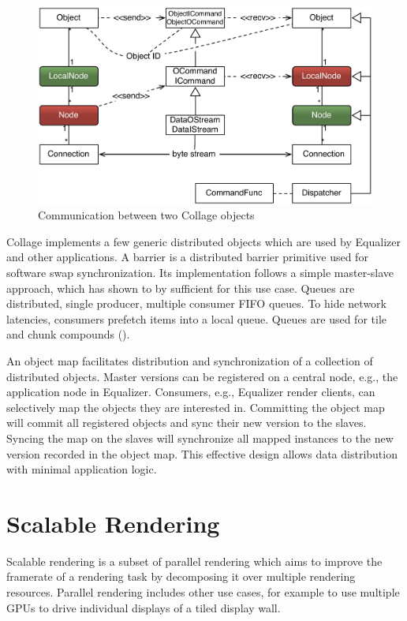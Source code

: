 \begin{figure}[ht]\center
  \includegraphics[width=\columnwidth]{images/netObject}
  \caption{\label{fNetObject}Communication between two \textsf{Collage} objects}
\end{figure}

\textsf{Collage} implements a few generic distributed objects which are used by
\textsf{Equalizer} and other applications. A barrier is a distributed barrier
primitive used for software swap synchronization. Its implementation follows a
simple master-slave approach, which has shown to by sufficient for this use
case. Queues are distributed, single producer, multiple consumer FIFO queues. To
hide network latencies, consumers prefetch items into a local queue. Queues are
used for tile and chunk compounds ().

An object map facilitates distribution and synchronization of a collection of
distributed objects. Master versions can be registered on a central node, e.g.,
the application node in \textsf{Equalizer}. Consumers, e.g., \textsf{Equalizer}
render clients, can selectively map the objects they are interested in.
Committing the object map will commit all registered objects and sync their new
version to the slaves. Syncing the map on the slaves will synchronize all mapped
instances to the new version recorded in the object map. This effective design
allows data distribution with minimal application logic.


\chapter{Scalable Rendering}\label{sScalable}

Scalable rendering is a subset of parallel rendering which aims to improve the
framerate of a rendering task by decomposing it over multiple rendering
resources. Parallel rendering includes other use cases, for example to use
multiple GPUs to drive individual displays of a tiled display wall.


